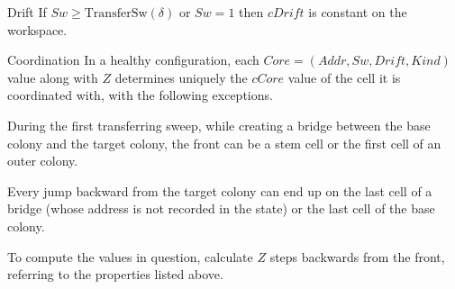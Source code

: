 \documentclass[12pt]{memoir}
\newcommand{\fld}[1]{\ensuremath{\textit{#1}}}
\newcommand{\E}{E}
\newcommand{\Z}{Z}
\newcommand{\Addr}{\fld{Addr}}
\newcommand{\Core}{\fld{Core}}
\newcommand{\cCore}{\fld{cCore}}
\newcommand{\Drift}{\fld{Drift}}
\newcommand{\cDrift}{\fld{cDrift}}
\newcommand{\Info}{\fld{Info}}
\newcommand{\Kind}{\fld{Kind}}
\newcommand{\State}{\fld{State}}
\newcommand{\Sweep}{\fld{Sw}}
\newcommand{\dir}{\mathrm{dir}}
\newcommand{\front}{\mathrm{front}}
\newcommand{\TransferSw}{\mathrm{TransferSw}}
\begin{document}
\begin{definition}
\begin{flushdescription}








        \item[Drift]%
         If \( \Sweep \ge \TransferSw(\delta) \) or \( \Sweep=1 \) then \( \cDrift \)
         is constant on the workspace.

\item[Coordination]
 In a healthy configuration, each \( \Core =(\Addr, \Sweep, \Drift, \Kind) \) 
 value along with \( \Z \) determines uniquely the 
\( \cCore \) value of the cell it is coordinated with, with the following exceptions.
\begin{bullets}
\item During the first transferring sweep, while
    creating a bridge between the base colony and the target colony, 
    the front can be a stem cell or the first cell of an outer colony.
 \item Every jump backward from the target colony can end up on the last cell of a 
   bridge (whose address is not recorded in the state) or the last cell of the base colony.
\end{bullets}
 To compute the values in question, calculate \( \Z \) steps backwards from the front,
referring to the properties listed above.

   \end{flushdescription}
 \end{definition}
\end{document}
